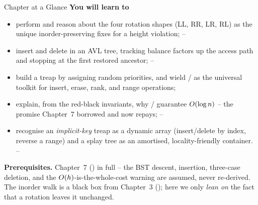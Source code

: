 \begin{chaptertheorybox}{Chapter at a Glance}
\textbf{You will learn to}
\begin{itemize}[nosep]
  \item perform and reason about the four rotation shapes (LL, RR, LR, RL) as the unique
        inorder-preserving fixes for a height violation; \hfill{}--
  \item insert and delete in an AVL tree, tracking balance factors up the access path and stopping at
        the first restored ancestor; \hfill{}--
  \item build a treap by assigning random priorities, and wield / as the
        universal toolkit for insert, erase, rank, and range operations; \hfill{}
  \item explain, from the red-black invariants, why / guarantee
        $O(\log n)$ -- the promise Chapter~7 borrowed and now repays; \hfill{}--
  \item recognise an \emph{implicit-key} treap as a dynamic array (insert/delete by index, reverse a
        range) and a splay tree as an amortised, locality-friendly container. \hfill{}--
\end{itemize}

\textbf{Prerequisites.} Chapter~7 () in full -- the BST descent, insertion, three-case
deletion, and the $O(h)$-is-the-whole-cost warning are assumed, never re-derived. The inorder
walk is a black box from Chapter~3 (); here we only \emph{lean on} the fact that a
rotation leaves it unchanged.
\end{chaptertheorybox}

